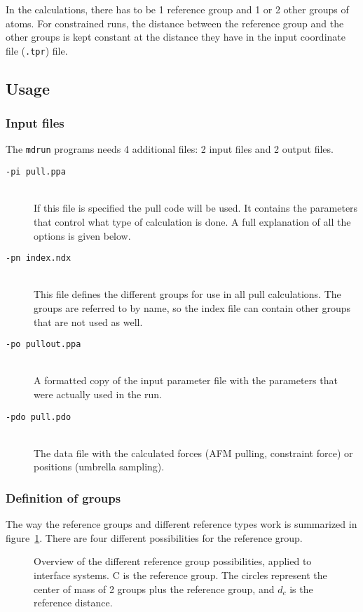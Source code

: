 In the calculations, there has to be 1 reference group and 1 or 2
other groups of atoms. For constrained runs, the distance between the
reference group and the other groups is kept constant at the distance
they have in the input coordinate file ({\tt .tpr}) file.

\subsection{Usage}

\subsubsection{Input files}

The {\tt mdrun} programs needs 4 additional files: 2 input files and 2
output files. 
\begin{description}
\item[\tt -pi pull.ppa]\mbox{}\\ If this file is specified the pull code will
be used. It contains the parameters that control what type of
calculation is done. A full explanation of all the options is given below.
\item[\tt -pn index.ndx]\mbox{}\\ This file defines the different groups for
use in all pull calculations. The groups are referred to by name, so
the index file can contain other groups that are not used as well. 
\item[\tt -po pullout.ppa]\mbox{}\\ A formatted copy of the input parameter
file with the parameters that were actually used in the run.
\item[\tt -pdo pull.pdo]\mbox{}\\ The data file with the calculated forces
(AFM pulling, constraint force) or positions (umbrella sampling).
\end{description}

\subsubsection{Definition of groups}

The way the reference groups and different reference types work is
summarized in figure~\ref{fi:pullref}. There are four different
possibilities for the reference group. 

\begin{figure}
\centerline{}
\caption{Overview of the different reference group possibilities,
applied to interface systems. C is the reference group. The circles
represent the center of mass of 2 groups plus the reference group, and
$d_c$ is the reference distance.}
\label{fi:pullref} 
\end{figure}   

